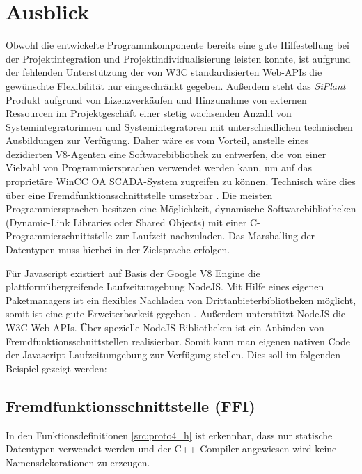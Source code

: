 \section{Ausblick}

Obwohl die entwickelte Programmkomponente bereits eine gute Hilfestellung bei der Projektintegration und Projektindividualisierung leisten konnte,
ist aufgrund der fehlenden Unterstützung der von W3C standardisierten Web-APIs die gewünschte Flexibilität nur eingeschränkt gegeben. Außerdem steht das 
\textit{SiPlant} Produkt aufgrund von Lizenzverkäufen und Hinzunahme von externen Ressourcen im Projektgeschäft
einer stetig wachsenden Anzahl von Systemintegratorinnen und Systemintegratoren mit unterschiedlichen technischen Ausbildungen zur Verfügung.
Daher wäre es vom Vorteil, anstelle eines dezidierten V8-Agenten eine Softwarebibliothek zu entwerfen, die von einer Vielzahl von 
Programmiersprachen verwendet werden kann, um auf das proprietäre WinCC OA SCADA-System zugreifen zu können. 
Technisch wäre dies über eine Fremdfunktionsschnittstelle umsetzbar \cite{ffi}. Die meisten 
Programmiersprachen besitzen eine Möglichkeit, dynamische Softwarebibliotheken (Dynamic-Link Libraries oder Shared Objects) 
mit einer C-Programmierschnittstelle zur Laufzeit nachzuladen. Das Marshalling der Datentypen muss hierbei in der Zielsprache erfolgen.
\newline
\par
Für Javascript existiert auf Basis der Google V8 Engine die plattformübergreifende Laufzeitumgebung NodeJS. Mit Hilfe eines eigenen
Paketmanagers ist ein flexibles Nachladen von Drittanbieterbibliotheken möglicht, somit ist eine gute Erweiterbarkeit gegeben \cite{nodejs}. 
Außerdem unterstützt NodeJS die W3C Web-APIs. Über spezielle NodeJS-Bibliotheken ist ein Anbinden von Fremdfunktionsschnittstellen realisierbar. Somit kann man
eigenen nativen Code der Javascript-Laufzeitumgebung zur Verfügung stellen. Dies soll im folgenden Beispiel gezeigt werden:

\subsection{Fremdfunktionsschnittstelle (FFI)}



In den Funktionsdefinitionen \ref{src:proto4_h} ist erkennbar, dass nur statische Datentypen verwendet werden und 
der C++-Compiler angewiesen wird keine Namensdekorationen zu erzeugen.

